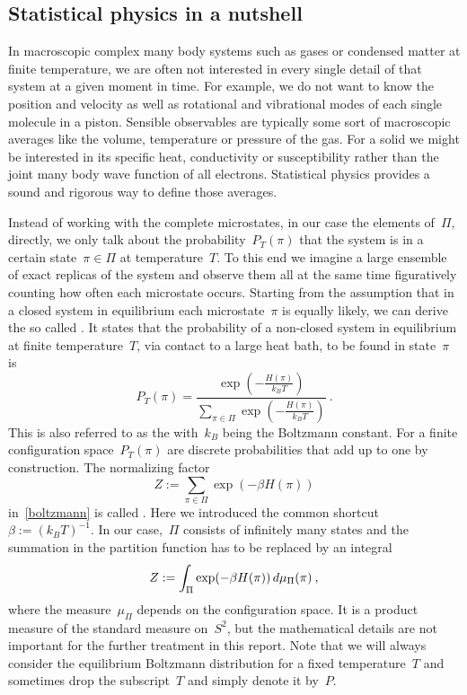\subsection{Statistical physics in a nutshell}

In macroscopic complex many body systems such as gases or condensed matter at
finite temperature, we are often not interested in every single detail of that
system at a given moment in time. For example, we do not want to know the
position and velocity as well as rotational and vibrational modes of each single
molecule in a piston. Sensible observables are typically some sort of
macroscopic averages like the volume, temperature or pressure of the gas. For a
solid we might be interested in its specific heat, conductivity or
susceptibility rather than the joint many body wave function of all electrons.
Statistical physics provides a sound and rigorous way to define those averages.

Instead of working with the complete microstates, in our case the elements
of~$\Pi$, directly, we only talk about the probability~$P_{T}(\pi)$ that the
system is in a certain state~$\pi \in \Pi$ at temperature~$T$. To this end we
imagine a large ensemble of exact replicas of the system and observe them all at
the same time figuratively counting how often each microstate occurs. Starting
from the assumption that in a closed system in equilibrium each microstate~$\pi$
is equally likely, we can derive the so called . It
states that the probability of a non-closed system in equilibrium at finite
temperature~$T$, \eg{} via contact to a large heat bath, to be found in
state~$\pi$ is
%
\begin{equation}\label{boltzmann}
  P_{T}(\pi) = \frac{\exp \left(- \frac{H(\pi)}{k_B T}\right)}
  {\sum_{\pi \in \Pi} \exp \left(- \frac{H(\pi)}{k_B T}\right)}\:.
\end{equation}
%
This is also referred to as the 
with~$k_B$ being the Boltzmann constant. For a finite configuration
space~$P_T(\pi)$ are discrete probabilities that add up to one by construction.
The normalizing factor
%
\begin{equation}
  Z := \sum_{\pi \in \Pi} \exp(-\beta H(\pi))
\end{equation}
%
in~\eqref{boltzmann} is called . Here we introduced
the common shortcut~$\beta := {(k_B T)}^{-1}$. In our case,~$\Pi$ consists of
infinitely many states and the summation in the partition function has to be
replaced by an integral
%
\begin{equation}
  Z := \int_{\Pi} \exp(-\beta H(\pi)) \,d\mu_{\Pi}(\pi)\:,
\end{equation}
%
where the measure~$\mu_{\Pi}$ depends on the configuration space. It is a
product measure of the standard measure on~$S^2$, but the mathematical details
are not important for the further treatment in this report. Note that we will
always consider the equilibrium Boltzmann distribution for a fixed
temperature~$T$ and sometimes drop the subscript~$T$ and simply denote it
by~$P$.

